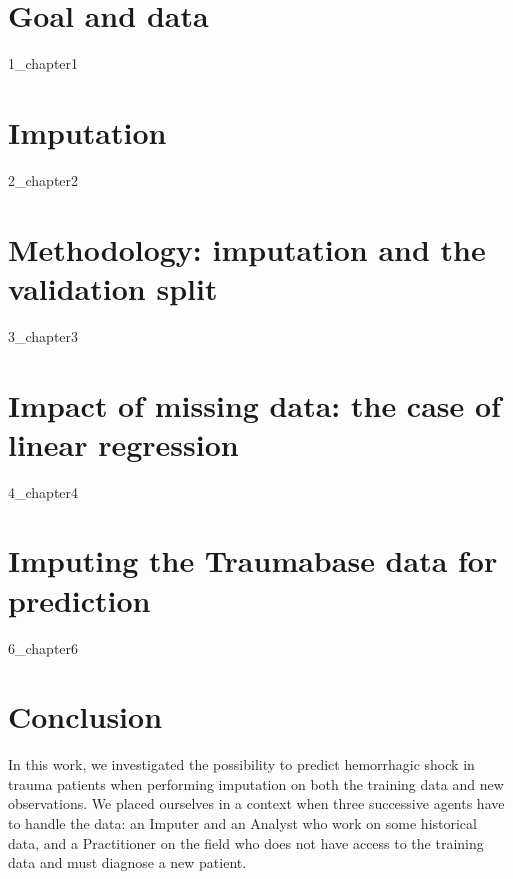 \documentclass[12pt, a4paper]{memoir}
\begin{document}

\chapter{Goal and data}
\label{data}
 {1_chapter1}

\chapter{Imputation}
\label{imputation}
{2_chapter2}
		
\chapter{Methodology: imputation and the validation split}
\label{validation}
{3_chapter3}
		
		
\chapter{Impact of missing data: the case of linear regression}
\label{linreg}
{4_chapter4} 


\chapter{Imputing the Traumabase data for prediction}
\label{analysis}
{6_chapter6}

\chapter*{Conclusion}
In this work, we investigated the possibility to predict hemorrhagic shock in trauma patients when performing imputation on both the training data and new observations. We placed ourselves in a context when three successive agents have to handle the data: an Imputer and an Analyst who work on some historical data, and a Practitioner on the field who does not have access to the training data and must diagnose a new patient.
\end{document}
